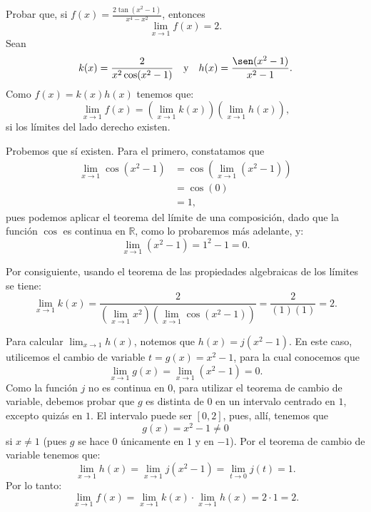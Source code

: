 \begin{exemplo}[Solución]{%
Probar que, si $\displaystyle f(x)=\frac{2\tan (x^2-1)}{x^4-x^2}$, entonces
\[
\lim_{x\to 1}f(x)=2.
\]
}%
Sean
\[
k(x) = \frac{2}{x^2\cos (x^2-1)} \yjc h(x)= \frac{\sen(x^2-1)}{x^2-1}.
\]
Como $f(x) = k(x)h(x)$ tenemos que:
\[
\lim_{x\to 1}f(x)=\left( \lim_{x\to 1}k(x) \right)  \left(\lim_{x\to 1}h(x)  \right),
\]
si los límites del lado derecho existen.

Probemos que sí existen. Para el primero, constatamos que
\begin{align*}
\lim_{x\to 1} \cos (x^2-1) & = \cos \left(\lim_{x\to 1}(x^2-1) \right)  \\
& =\cos (0) \\
&=1,
\end{align*}
pues podemos aplicar el teorema del límite de una composición, dado que la función $\cos$ es continua en
$\mathbb{R}$, como lo probaremos más adelante, y:
\[
\lim_{x\to 1}(x^2-1)= 1^2-1 = 0.
\]

Por consiguiente, usando el teorema de las propiedades algebraicas de los límites se tiene:
\[
\lim_{x\to 1}k(x)= \frac{2}{\left( \lim_{x\to 1}x^2 \right)
\left(\lim_{x\to 1}\cos (x^2-1)  \right)} = \frac{2}{(1)(1)} =2.
\]

Para calcular $\displaystyle\lim_{x\to 1}h(x)$, notemos que $h(x)=j(x^2-1)$. En este caso, utilicemos el cambio
de variable $t=g(x)= x^2-1$, para la cual conocemos que
\[
  \lim_{x\to 1}g(x) =\lim_{x\to 1}(x^2-1) =0.
\]
Como la función $j$ no es continua en 0, para utilizar el teorema de cambio de variable, debemos
probar que $g$ es distinta de $0$ en un intervalo centrado en $1$, excepto quizás en $1$. El
intervalo puede ser $[0,2]$, pues, allí, tenemos que
\[
g(x) = x^2 - 1 \neq 0
\]
si $x\neq 1$ (pues $g$ se hace $0$ únicamente en $1$ y en $-1$). Por el teorema de cambio de
variable tenemos que:
\[
\lim_{x\to 1}h(x)= \lim_{x\to 1}j(x^2-1)= \lim_{t\to 0}j(t)=1.
\]
Por lo tanto:
\[
\lim_{x\to 1}f(x)=\lim_{x\to 1}k(x)\cdot \lim_{x\to 1}h(x) =2\cdot 1= 2.
\]
\end{exemplo}

